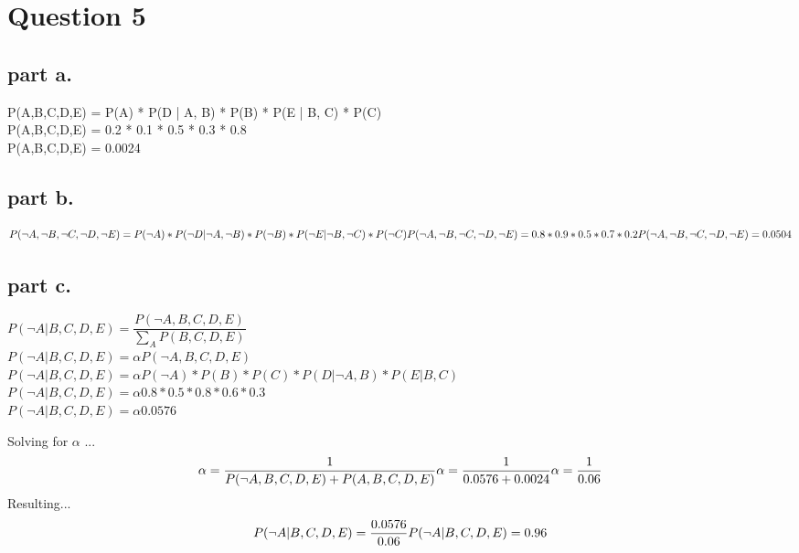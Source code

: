 \section{Question 5}

\subsection{part a.}
P(A,B,C,D,E) = P(A) * P(D | A, B) * P(B) * P(E | B, C) * P(C) \\
P(A,B,C,D,E) = 0.2 * 0.1 * 0.5 * 0.3 * 0.8 \\
P(A,B,C,D,E) = 0.0024

\subsection{part b.}
\[
P(\neg{A},\neg{B},\neg{C},\neg{D},\neg{E}) = P(\neg{A}) * P(\neg{D} | \neg{A}, \neg{B}) * P(\neg{B}) * P(\neg{E} | \neg{B}, \neg{C}) * P(\neg{C}) \\
P(\neg{A},\neg{B},\neg{C},\neg{D},\neg{E}) = 0.8 * 0.9 * 0.5 * 0.7 * 0.2 \\
P(\neg{A},\neg{B},\neg{C},\neg{D},\neg{E}) = 0.0504
\]
\subsection{part c.}


$ P(\neg{A} | B,C,D,E) = \dfrac{P(\neg{A}, B, C, D, E)}{\sum\limits_{A}^{} P(B, C, D, E)} $ \\
$ P(\neg{A} | B,C,D,E) = \alpha P(\neg{A}, B, C, D, E) $ \\
$ P(\neg{A} | B,C,D,E) = \alpha P(\neg{A}) * P(B) * P(C) * P(D | \neg{A}, B) * P(E | B, C) $ \\
$ P(\neg{A} | B,C,D,E) = \alpha 0.8 * 0.5 * 0.8 * 0.6 * 0.3 $ \\
$ P(\neg{A} | B,C,D,E) = \alpha 0.0576 $ 

\newpage
Solving for $\alpha$ ... \\
\[\alpha = \dfrac{1}{P(\neg{A},B,C,D,E) + P(A,B,C,D,E)} \\
\alpha = \dfrac{1}{0.0576 + 0.0024} \\
\alpha = \dfrac{1}{0.06} \\
\]
Resulting...\\
\[
P(\neg{A} | B,C,D,E) = \dfrac{0.0576}{0.06}  \\
P(\neg{A} | B,C,D,E) = 0.96
\]
